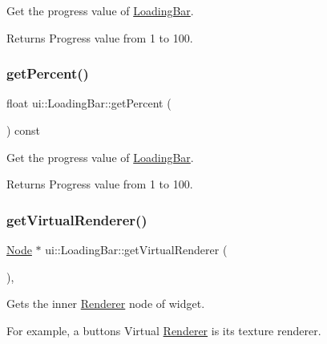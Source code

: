 Get the progress value of \hyperlink{classui_1_1LoadingBar}{Loading\+Bar}.

\begin{DoxyReturn}{Returns}
Progress value from 1 to 100. 
\end{DoxyReturn}
\mbox{\label{classui_1_1LoadingBar_a8a0ce53c7f26ef008cd31873eea7889b}} 
\subsubsection{\texorpdfstring{get\+Percent()}{getPercent()}\hspace{0.1cm}{\footnotesize\ttfamily [2/2]}}
{\footnotesize\ttfamily float ui\+::\+Loading\+Bar\+::get\+Percent (\begin{DoxyParamCaption}{ }\end{DoxyParamCaption}) const}

Get the progress value of \hyperlink{classui_1_1LoadingBar}{Loading\+Bar}.

\begin{DoxyReturn}{Returns}
Progress value from 1 to 100. 
\end{DoxyReturn}
\mbox{\label{classui_1_1LoadingBar_a20c987a6a4fa0b50cb1ff3cf7cfd17b6}} 
\subsubsection{\texorpdfstring{get\+Virtual\+Renderer()}{getVirtualRenderer()}\hspace{0.1cm}{\footnotesize\ttfamily [1/2]}}
{\footnotesize\ttfamily \hyperlink{classNode}{Node} $\ast$ ui\+::\+Loading\+Bar\+::get\+Virtual\+Renderer (\begin{DoxyParamCaption}{ }\end{DoxyParamCaption})\hspace{0.3cm}{\ttfamily [override]}, {\ttfamily [virtual]}}

Gets the inner \hyperlink{classRenderer}{Renderer} node of widget.

For example, a button\textquotesingle{}s Virtual \hyperlink{classRenderer}{Renderer} is it\textquotesingle{}s texture renderer.

